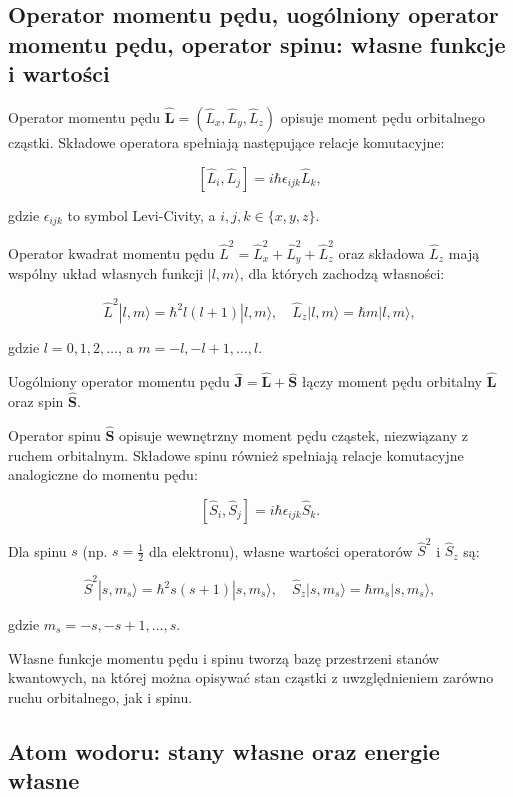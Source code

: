 \begin{itemize}
\begin{itemize}
{\subsection{Operator momentu pędu, uogólniony operator momentu pędu, operator spinu: własne funkcje i wartości}


Operator momentu pędu \(\hat{\mathbf{L}} = (\hat{L}_x, \hat{L}_y, \hat{L}_z)\) opisuje moment pędu orbitalnego cząstki. Składowe operatora spełniają następujące relacje komutacyjne:

\[
[\hat{L}_i, \hat{L}_j] = i \hbar \epsilon_{ijk} \hat{L}_k,
\]

gdzie \(\epsilon_{ijk}\) to symbol Levi-Civity, a \(i, j, k \in \{x,y,z\}\).

Operator kwadrat momentu pędu \(\hat{L}^2 = \hat{L}_x^2 + \hat{L}_y^2 + \hat{L}_z^2\) oraz składowa \(\hat{L}_z\) mają wspólny układ własnych funkcji \(|l, m\rangle\), dla których zachodzą własności:

\[
\hat{L}^2 |l, m\rangle = \hbar^2 l(l+1) |l, m\rangle, \quad \hat{L}_z |l, m\rangle = \hbar m |l, m\rangle,
\]

gdzie \(l = 0, 1, 2, \ldots\), a \(m = -l, -l+1, \ldots, l\).

Uogólniony operator momentu pędu \(\hat{\mathbf{J}} = \hat{\mathbf{L}} + \hat{\mathbf{S}}\) łączy moment pędu orbitalny \(\hat{\mathbf{L}}\) oraz spin \(\hat{\mathbf{S}}\).

Operator spinu \(\hat{\mathbf{S}}\) opisuje wewnętrzny moment pędu cząstek, niezwiązany z ruchem orbitalnym. Składowe spinu również spełniają relacje komutacyjne analogiczne do momentu pędu:

\[
[\hat{S}_i, \hat{S}_j] = i \hbar \epsilon_{ijk} \hat{S}_k.
\]

Dla spinu \(s\) (np. \(s = \frac{1}{2}\) dla elektronu), własne wartości operatorów \(\hat{S}^2\) i \(\hat{S}_z\) są:

\[
\hat{S}^2 |s, m_s\rangle = \hbar^2 s(s+1) |s, m_s\rangle, \quad \hat{S}_z |s, m_s\rangle = \hbar m_s |s, m_s\rangle,
\]

gdzie \(m_s = -s, -s+1, \ldots, s\).

Własne funkcje momentu pędu i spinu tworzą bazę przestrzeni stanów kwantowych, na której można opisywać stan cząstki z uwzględnieniem zarówno ruchu orbitalnego, jak i spinu.

\subsection{Atom wodoru: stany własne oraz energie własne}


}
\end{itemize}
\end{itemize}
